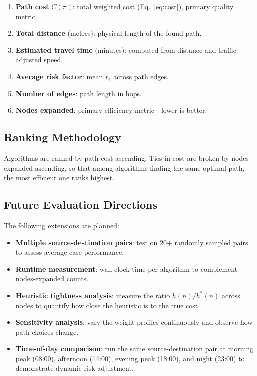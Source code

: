 ﻿\documentclass[a4paper, 12pt]{article}
\theoremstyle{remark}
\begin{document}
\begin{enumerate}
    \item \textbf{Path cost} $C(\pi)$: total weighted cost (Eq.~\ref{eq:cost}), primary quality metric.
    \item \textbf{Total distance} (metres): physical length of the found path.
    \item \textbf{Estimated travel time} (minutes): computed from distance and traffic-adjusted speed.
    \item \textbf{Average risk factor}: mean $r_e$ across path edges.
    \item \textbf{Number of edges}: path length in hops.
    \item \textbf{Nodes expanded}: primary efficiency metric---lower is better.
\end{enumerate}

\subsection{Ranking Methodology}

Algorithms are ranked by path cost ascending. Ties in cost are broken by nodes expanded ascending, so that among algorithms finding the same optimal path, the most efficient one ranks highest.

\subsection{Future Evaluation Directions}

The following extensions are planned:
\begin{itemize}
    \item \textbf{Multiple source-destination pairs}: test on 20+ randomly sampled pairs to assess average-case performance.
    \item \textbf{Runtime measurement}: wall-clock time per algorithm to complement nodes-expanded counts.
    \item \textbf{Heuristic tightness analysis}: measure the ratio $h(n)/h^*(n)$ across nodes to quantify how close the heuristic is to the true cost.
    \item \textbf{Sensitivity analysis}: vary the weight profiles continuously and observe how path choices change.
    \item \textbf{Time-of-day comparison}: run the same source-destination pair at morning peak (08:00), afternoon (14:00), evening peak (18:00), and night (23:00) to demonstrate dynamic risk adjustment.
\end{itemize}
\end{document}
